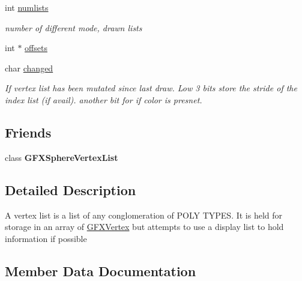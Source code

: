 \begin{DoxyCompactItemize}
\item 
int \hyperlink{classGFXVertexList_a50b552e54f117f7456f3cb618c076190}{numlists}\hypertarget{classGFXVertexList_a50b552e54f117f7456f3cb618c076190}{}\label{classGFXVertexList_a50b552e54f117f7456f3cb618c076190}

\begin{DoxyCompactList}\small\item\em number of different mode, drawn lists \end{DoxyCompactList}\item 
int $\ast$ \hyperlink{classGFXVertexList_a0310e1bd4dbc7bfb1240b200368ce8c9}{offsets}
\item 
char \hyperlink{classGFXVertexList_a3d7999f82e16363e359e77f44175bc48}{changed}\hypertarget{classGFXVertexList_a3d7999f82e16363e359e77f44175bc48}{}\label{classGFXVertexList_a3d7999f82e16363e359e77f44175bc48}

\begin{DoxyCompactList}\small\item\em If vertex list has been mutated since last draw. Low 3 bits store the stride of the index list (if avail). another bit for if color is presnet. \end{DoxyCompactList}\end{DoxyCompactItemize}
\subsection*{Friends}
\begin{DoxyCompactItemize}
\item 
class {\bfseries G\+F\+X\+Sphere\+Vertex\+List}\hypertarget{classGFXVertexList_a318d264f73ad682e0de493cce9fde224}{}\label{classGFXVertexList_a318d264f73ad682e0de493cce9fde224}

\end{DoxyCompactItemize}


\subsection{Detailed Description}
A vertex list is a list of any conglomeration of P\+O\+LY T\+Y\+P\+ES. It is held for storage in an array of \hyperlink{structGFXVertex}{G\+F\+X\+Vertex} but attempts to use a display list to hold information if possible 

\subsection{Member Data Documentation}
